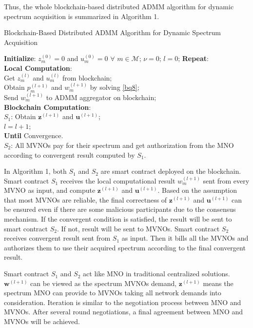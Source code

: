 \documentclass[journal]{IEEEtran}
\begin{document}
Thus, the whole blockchain-based distributed ADMM algorithm for dynamic spectrum acquisition is summarized in Algorithm 1.

\begin{algorithm}[h]
\caption{Blockchain-Based Distributed ADMM Algorithm for Dynamic Spectrum Acquisition}
\begin{algorithmic}[1]
\STATE \textbf{Initialize}: $z_m^{(0)}=0$ and $u_m^{(0)}=0$ $\forall$ $m\in\mathcal{M}$; $\nu=0$; $l=0$;
\STATE \textbf{Repeat}: \\
\hspace{0.5cm} \textbf{Local Computation}:\\
\hspace{1.0cm} Get $z_m^{(l)}$ and $u_m^{(l)}$ from blockchain;\\
\hspace{1.0cm} Obtain $p_m^{(l+1)}$ and $w_m^{(l+1)}$ by solving \eqref{bq8}; \\
\hspace{1.0cm} Send $w_m^{(l+1)}$ to ADMM aggregator on blockchain;\\
\hspace{0.5cm} \textbf{Blockchain Computation}:\\
\hspace{1.0cm} {\color{red}$ S_1$: } Obtain $\mathbf{z}^{(l+1)}$ and $\mathbf{u}^{(l+1)}$; \\
\hspace{0.5cm} $l=l+1$;\\
\textbf{Until} Convergence.\\
{\color{red} \STATE $ S_2$: All MVNOs pay for their spectrum and get authorization from the MNO according to convergent result computed by $S_1$.} \\

\end{algorithmic}
\end{algorithm}
{
	\color{red} 
	In Algorithm 1, both $ S_1 $ and $ S_2 $ are smart contract deployed on the blockchain. Smart contract $ S_1 $ receives the local computational result $ w_m^{(l+1)} $ sent from every MVNO as input, and compute $ \mathbf{z}^{(l+1)} $ and $ \mathbf{u}^{(l+1)} $. Based on the assumption that most MVNOs are reliable, the final correctness of $ \mathbf{z}^{(l+1)} $ and $ \mathbf{u}^{(l+1)} $ can be ensured even if there are some malicious participants due to the consensus mechanism. If the convergent condition is satisfied, the result will be sent to smart contract $ S_2 $. If not, result will be sent to MVNOs. Smart contract $ S_2 $ receives convergent result sent from $ S_1 $ as input. Then it bills all the MVNOs and authorizes them to use their acquired spectrum according to the final convergent result. 
	
	Smart contract $ S_1 $ and $ S_2 $ act like MNO in traditional centralized solutions. $ \mathbf{w}^{(l+1)} $ can be viewed as the spectrum MVNOs demand, $ \mathbf{z}^{(l+1)} $ means the spectrum MNO can provide to MVNOs taking all network demands into consideration. Iteration is similar to the negotiation process between MNO and MVNOs. After several round negotiations, a final agreement between MNO and MVNOs will be achieved.
} 
\end{document}
